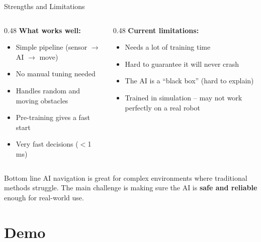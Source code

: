 \documentclass[aspectratio=169, 11pt]{beamer}
\begin{document}
\begin{frame}{Strengths and Limitations}

  \begin{columns}[T]
    \begin{column}{0.48\textwidth}
      \textbf{\color{softgreen!80!black}What works well:}
      \begin{itemize}\small
        \item Simple pipeline (sensor $\rightarrow$ AI $\rightarrow$ move)
        \item No manual tuning needed
        \item Handles random and moving obstacles
        \item Pre-training gives a fast start
        \item Very fast decisions ($<$1\,ms)
      \end{itemize}
    \end{column}
    \begin{column}{0.48\textwidth}
      \textbf{\color{upecred}Current limitations:}
      \begin{itemize}\small
        \item Needs a lot of training time
        \item Hard to guarantee it will never crash
        \item The AI is a ``black box'' (hard to explain)
        \item Trained in simulation -- may not work
              perfectly on a real robot
      \end{itemize}
    \end{column}
  \end{columns}

  \vspace{0.4em}

  \begin{block}{Bottom line}
    \small AI navigation is great for complex environments where
    traditional methods struggle. The main challenge is making sure
    the AI is \textbf{safe and reliable} enough for real-world use.
  \end{block}
\end{frame}

\section{Demo}
\end{document}
